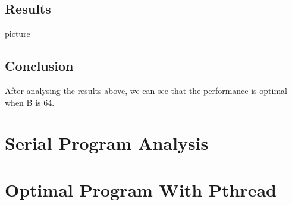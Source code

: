 \documentclass[a4paper, 11pt]{article}
\begin{document}
\subsection{Results}
picture

\subsection{Conclusion}
After analysing the results above, we can see that the performance is optimal
when B is 64.

\section{Serial Program Analysis}

\section{Optimal Program With Pthread}
\end{document}
